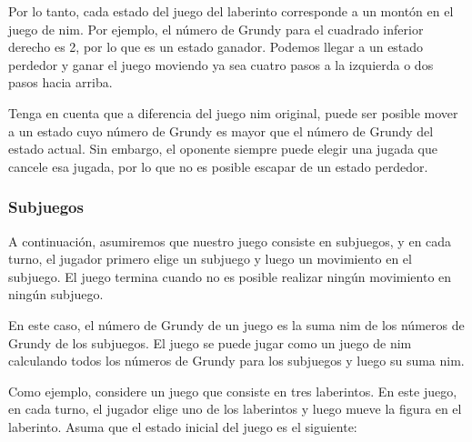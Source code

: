 Por lo tanto, cada estado del juego del laberinto
corresponde a un montón en el juego de nim.
Por ejemplo, el número de Grundy para
el cuadrado inferior derecho es 2,
por lo que es un estado ganador.
Podemos llegar a un estado perdedor y
ganar el juego moviendo
ya sea cuatro pasos a la izquierda o
dos pasos hacia arriba.

Tenga en cuenta que a diferencia del juego nim original,
puede ser posible mover a un estado cuyo
número de Grundy es mayor que el número de Grundy
del estado actual.
Sin embargo, el oponente siempre puede elegir una jugada
que cancele esa jugada, por lo que no es posible
escapar de un estado perdedor.

\subsubsection{Subjuegos}

A continuación, asumiremos que nuestro juego consiste
en subjuegos, y en cada turno, el jugador
primero elige un subjuego y luego un movimiento en el subjuego.
El juego termina cuando no es posible realizar ningún movimiento
en ningún subjuego.

En este caso, el número de Grundy de un juego
es la suma nim de los números de Grundy de los subjuegos.
El juego se puede jugar como un juego de nim calculando
todos los números de Grundy para los subjuegos y luego su suma nim.

Como ejemplo, considere un juego que consiste
en tres laberintos.
En este juego, en cada turno, el jugador elige uno
de los laberintos y luego mueve la figura en el laberinto.
Asuma que el estado inicial del juego es el siguiente:

